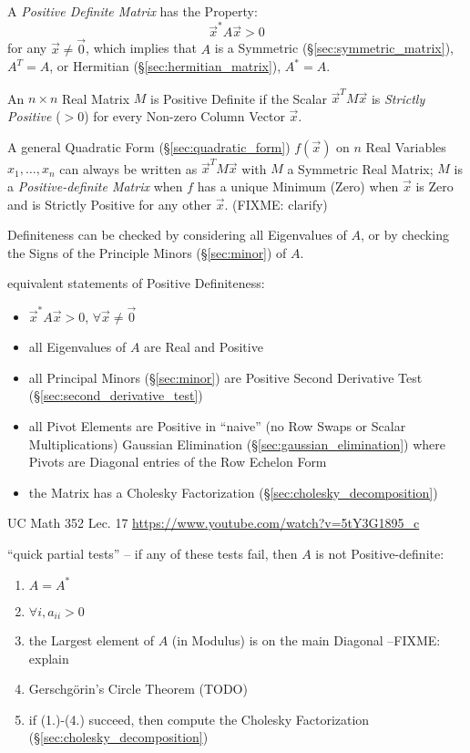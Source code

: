 A \emph{Positive Definite Matrix} has the Property:
\[
  \vec{x}^* A \vec{x} > 0
\]
for any $\vec{x} \neq \vec{0}$, which implies that $A$ is a Symmetric
(\S\ref{sec:symmetric_matrix}), $A^T = A$, or Hermitian
(\S\ref{sec:hermitian_matrix}), $A^* = A$.

An $n \times n$ Real Matrix $M$ is Positive Definite if the Scalar
$\vec{x}^TM\vec{x}$ is \emph{Strictly Positive} ($>0$) for every Non-zero
Column Vector $\vec{x}$.

A general Quadratic Form (\S\ref{sec:quadratic_form}) $f(\vec{x})$ on $n$ Real
Variables $x_1,\ldots,x_n$ can always be written as $\vec{x}^T M \vec{x}$ with
$M$ a Symmetric Real Matrix; $M$ is a \emph{Positive-definite Matrix} when $f$
has a unique Minimum (Zero) when $\vec{x}$ is Zero and is Strictly Positive for
any other $\vec{x}$. (FIXME: clarify)

Definiteness can be checked by considering all Eigenvalues of $A$, or by
checking the Signs of the Principle Minors (\S\ref{sec:minor}) of $A$.

equivalent statements of Positive Definiteness:
\begin{itemize}
  \item $\vec{x}^*A\vec{x} > 0$, $\forall \vec{x} \neq \vec{0}$
  \item all Eigenvalues of $A$ are Real and Positive
  \item all Principal Minors (\S\ref{sec:minor}) are Positive \fist Second
    Derivative Test (\S\ref{sec:second_derivative_test})
  \item all Pivot Elements are Positive in ``naive'' (no Row Swaps or Scalar
    Multiplications) Gaussian Elimination (\S\ref{sec:gaussian_elimination})
    where Pivots are Diagonal entries of the Row Echelon Form
  \item the Matrix has a Cholesky Factorization
    (\S\ref{sec:cholesky_decomposition})
\end{itemize}

UC Math 352 Lec. 17 \url{https://www.youtube.com/watch?v=5tY3G1895_c}

``quick partial tests'' -- if any of these tests fail, then $A$ is not
Positive-definite:
\begin{enumerate}
  \item $A = A^*$
  \item $\forall{i}, a_{ii} > 0$
  \item the Largest element of $A$ (in Modulus) is on the main Diagonal
    --FIXME: explain
  \item Gerschg\"orin's Circle Theorem (TODO)
  \item if (1.)-(4.) succeed, then compute the Cholesky Factorization
    (\S\ref{sec:cholesky_decomposition})
\end{enumerate}

